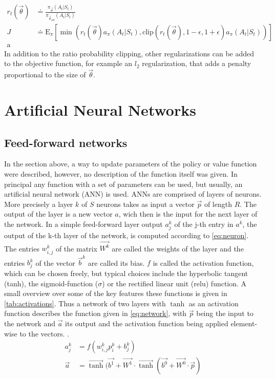 \begin{align}
	r_t(\vec{\theta}) &\doteq \frac{\pi_{\vec{\theta}}(A_t \vert S_t)}{\pi_{\vec{\theta}_{old}} (A_t \vert S_t)} \\
	J &\doteq \mathrm{E}_\pi \left[\min \left(r_t(\vec{\theta}) a_\pi(A_t \vert S_t), \mathrm{clip}(r_t(\vec{\theta}), 1- \epsilon, 1+\epsilon) a_\pi(A_t \vert S_t) \right) \right] \label{eq:object_ppo} \\
			\boldsymbol{\mathrm{a}}
\end{align}
In addition to the ratio probability clipping, other regularizations can be added to the objective function, for example an $l_2$ regularization, that adds a penalty proportional to the size of $\vec{\theta}$.



\section{Artificial Neural Networks}
\subsection{Feed-forward networks}
In the section above, a way to update parameters of the policy or value function were described, however, no description of the function itself was given. In principal any function with a set of parameters can be used, but usually, an artificial neural network (ANN) is used. ANNs are comprised of layers of neurons. More precisely a layer $k$ of $S$ neurons takes as input a vector $\vec{p}$ of length $R$. The output of the layer is a new vector $a$, wich then is the input for the next layer of the network. In a simple feed-forward layer output $a_j^k$ of the j-th entry in $a^k$, the output of the k-th layer of the network, is computed according to \eqref{eq:neuron}. The entries $w_{i,j}^k$ of the matrix $\vec{W^k}$ are called the weights of the layer and the entries $b_j^k$ of the vector $\vec{b}^k$ are called its bias. $f$ is called the activation function, which can be chosen freely, but typical choices include the hyperbolic tangent (tanh), the sigmoid-function ($\sigma$) or the rectified linear unit ($\mathrm{relu}$) function. A small overview over some of the key features these functions is given in \autoref{tab:activations}. Thus a network of two layers with $\tanh$ as an activation function describes the function given in \eqref{eq:network}, with $\vec{p}$  being the input to the network and $\vec{a}$ its output and the activation function being applied element-wise to the vectors. \cite[p. 2-2 - 2-12]{demuth_neural_2014}.
\begin{align}
	a_j^k &= f(w_{i,j}^k p^k_i + b_j^k) \label{eq:neuron} \\
	\vec{a} &= \vec{\tanh} (\vec{b^1} + \vec{W^1} \cdot \vec{\tanh}( \vec{b^0} + \vec{W^0} \cdot \vec{p} ) \label{eq:network}
\end{align}


